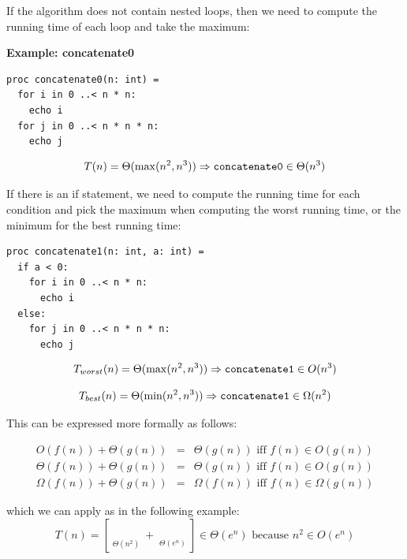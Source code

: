 \documentclass[justified, sixbynine]{tufte-book}
\def\stackunder#1#2{\mathrel{\mathop{#2}\limits_{#1}}}
\def\subsubsection#1{{\bf #1}}
\theoremstyle{plain}%
\newtheorem * {corollary}{Corollary}
\theoremstyle{definition}
\theoremstyle{remark}
\newtheorem * {remark}{Remark}
\newtheorem * {note}{Note}
\begin{document}
\begin{fullwidth}
If the algorithm does not contain nested loops, then we need to compute the running time of each loop and take the maximum:

\subsubsection{Example: concatenate0}
\begin{lstlisting}
proc concatenate0(n: int) =
  for i in 0 ..< n * n:
    echo i
  for j in 0 ..< n * n * n:
    echo j
\end{lstlisting}

\begin{equation}
T(n)=\Theta (\max (n^2, n^3))\Rightarrow \text{{\tt concatenate0}}\in \Theta
(n^3)
\end{equation}

If there is an if statement, we need to compute the running time for each condition and pick the maximum when computing the worst running time, or the minimum for the best running time:

\begin{lstlisting}
proc concatenate1(n: int, a: int) =
  if a < 0:
    for i in 0 ..< n * n:
      echo i
  else:
    for j in 0 ..< n * n * n:
      echo j
\end{lstlisting}

\begin{equation}
T_{worst}(n)=\Theta (\max (n^2, n^3))\Rightarrow \text{{\tt concatenate1}}\in O(n^3)
\end{equation}

\begin{equation}
T_{best}(n)=\Theta (\min (n^2, n^3))\Rightarrow \text{{\tt concatenate1}}\in \Omega(n^2)
\end{equation}

This can be expressed more formally as follows:

\begin{eqnarray}
O(f(n))+\Theta (g(n)) &=&\Theta (g(n))\text{ iff }f(n)\in O(g(n)) \\
\Theta (f(n))+\Theta (g(n)) &=&\Theta (g(n))\text{ iff }f(n)\in O(g(n)) \\
\Omega (f(n))+\Theta (g(n)) &=&\Omega (f(n))\text{ iff }f(n)\in \Omega (g(n))
\end{eqnarray}

which we can apply as in the following example:
\begin{equation}
T(n)=[\stackunder{\Theta (n^2)}{\underbrace{n^2+n+3}}+\stackunder{\Theta
(e^n)}{\underbrace{e^n-\log n}}]\in \Theta (e^n)\text{ because }n^2\in
O(e^n)
\end{equation}


\end{fullwidth}
\end{document}
